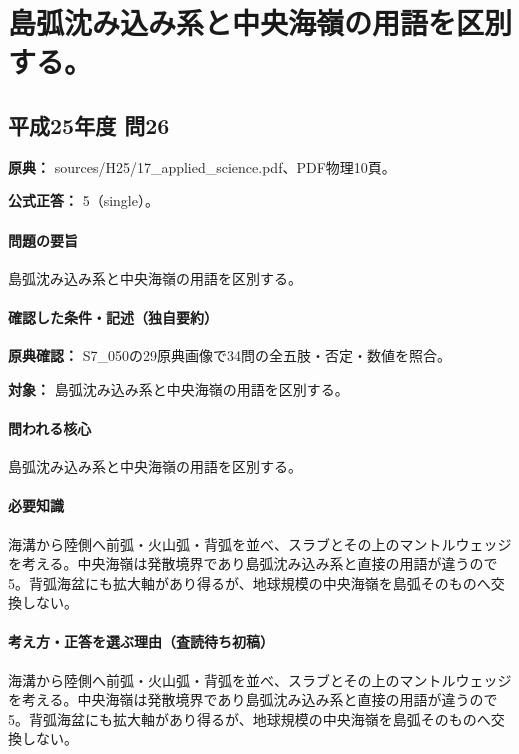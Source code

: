 \section{島弧沈み込み系と中央海嶺の用語を区別する。}

\subsection{平成25年度 問26}
\label{q:h25-reg-applied-26}

\noindent\textbf{原典：} sources/H25/17\_applied\_science.pdf、PDF物理10頁。

\textbf{公式正答：} 5（single）。

\paragraph{問題の要旨} 島弧沈み込み系と中央海嶺の用語を区別する。

\paragraph{確認した条件・記述（独自要約）}\mbox{}\par

\noindent\textbf{原典確認：} S7\_050の29原典画像で34問の全五肢・否定・数値を照合。\par

\noindent\textbf{対象：} 島弧沈み込み系と中央海嶺の用語を区別する。\par

\paragraph{問われる核心} 島弧沈み込み系と中央海嶺の用語を区別する。

\paragraph{必要知識} 海溝から陸側へ前弧・火山弧・背弧を並べ、スラブとその上のマントルウェッジを考える。中央海嶺は発散境界であり島弧沈み込み系と直接の用語が違うので5。背弧海盆にも拡大軸があり得るが、地球規模の中央海嶺を島弧そのものへ交換しない。

\paragraph{考え方・正答を選ぶ理由（査読待ち初稿）} 海溝から陸側へ前弧・火山弧・背弧を並べ、スラブとその上のマントルウェッジを考える。中央海嶺は発散境界であり島弧沈み込み系と直接の用語が違うので5。背弧海盆にも拡大軸があり得るが、地球規模の中央海嶺を島弧そのものへ交換しない。

